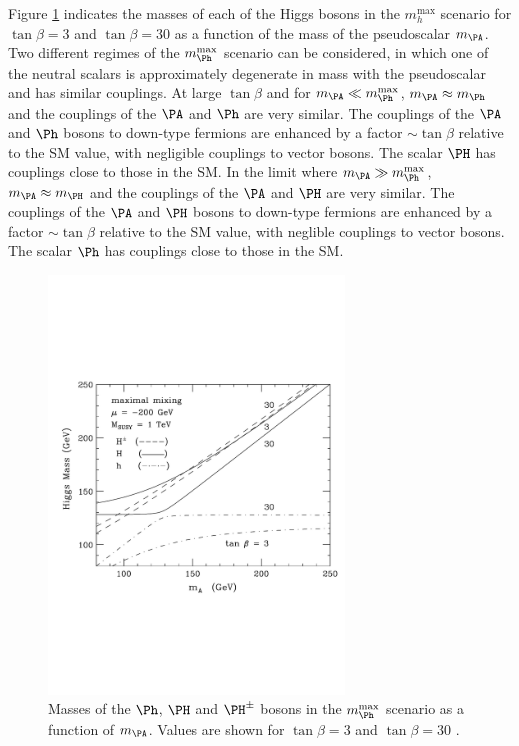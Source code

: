 Figure \ref{fig:mhmaxmasses} indicates the
masses of each of the Higgs bosons in the $m_{h}^{\text{max}}$ scenario
for $\tan\beta=3$ and $\tan\beta=30$ as a function of the mass of the
pseudoscalar $m_{\PA}$. Two different regimes of the $m_{\Ph}^{\text{max}}$
scenario can be considered, in which one of the neutral scalars is approximately
degenerate in mass with the pseudoscalar and has similar couplings. 
At large $\tan\beta$ and for $m_{\PA} \ll m_{\Ph}^{\text{max}}$, $m_{\PA}
\approx m_{\Ph}$ and the couplings of the $\PA$ and $\Ph$ are very similar. The
couplings of the $\PA$ and $\Ph$ bosons to down-type fermions 
are enhanced by a factor $\sim \tan\beta$ relative to the \ac{SM} value, with
negligible couplings to vector bosons. The scalar $\PH$ has couplings
close to those in the \ac{SM}. In the limit where $m_{\PA} \gg
m_{\Ph}^{\text{max}}$, 
$m_{\PA} \approx m_{\PH}$ and the couplings of the $\PA$ and $\PH$ are
very similar. The couplings of the $\PA$ and $\PH$ bosons to down-type fermions 
are enhanced by a factor $\sim \tan\beta$ relative to the \ac{SM} value, 
with neglible couplings to vector bosons. The scalar $\Ph$ has couplings
close to those in the \ac{SM}. 

\begin{figure}[htbp]
   \includegraphics[width=0.7\textwidth]{plots/theory/mssm_masses_mhmax.pdf}
\caption{Masses of the $\Ph$, $\PH$ and $\PH^{\pm}$ bosons in the
$m_{\Ph}^{\text{max}}$ scenario as a function of $m_{\PA}$. Values are shown for
$\tan\beta=3$ and $\tan\beta=30$ \cite{Carena:2002es}.}
\label{fig:mhmaxmasses}
\end{figure}

